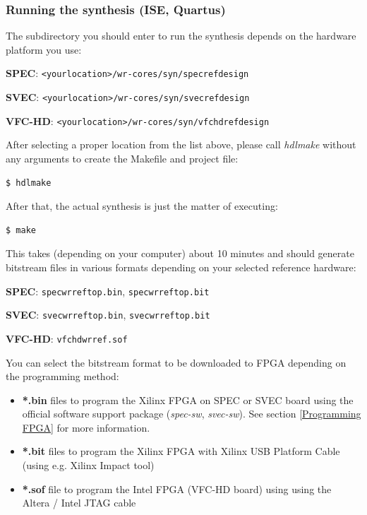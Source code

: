 \documentclass[a4paper, 12pt]{article}
\renewcommand{\_}{\underscore\allowbreak}
\begin{document}
\subsubsection{Running the synthesis (ISE, Quartus)}
The subdirectory you should enter to run the synthesis depends on the hardware
platform you use:
\begin{itemize*}
  \item \textbf{SPEC}: \texttt{<your\_location>/wr-cores/syn/spec\_ref\_design}
  \item \textbf{SVEC}: \texttt{<your\_location>/wr-cores/syn/svec\_ref\_design}
  \item \textbf{VFC-HD}: \texttt{<your\_location>/wr-cores/syn/vfchd\_ref\_design}
\end{itemize*}

After selecting a proper location from the list above, please call
\textit{hdlmake} without any arguments to create the Makefile and project file:
\begin{lstlisting}
$ hdlmake
\end{lstlisting}

After that, the actual synthesis is just the matter of executing:
\begin{lstlisting}
$ make
\end{lstlisting}

This takes (depending on your computer) about 10 minutes and should generate
bitstream files in various formats depending on your selected reference
hardware:
\begin{itemize*}
  \item \textbf{SPEC}: \texttt{spec\_wr\_ref\_top.bin}, \texttt{spec\_wr\_ref\_top.bit}
  \item \textbf{SVEC}: \texttt{svec\_wr\_ref\_top.bin}, \texttt{svec\_wr\_ref\_top.bit}
  \item \textbf{VFC-HD}: \texttt{vfchd\_wr\_ref.sof}
\end{itemize*}

You can select the bitstream format to be downloaded to FPGA depending on the
programming method:
\begin{itemize}
  \item \textbf{*.bin} files to program the Xilinx FPGA on SPEC or SVEC board
    using the official software support package (\textit{spec-sw},
    \textit{svec-sw}). See section \ref{Programming FPGA} for more
    information.
  \item \textbf{*.bit} files to program the Xilinx FPGA with Xilinx USB Platform
    Cable (using e.g. Xilinx Impact tool)
  \item \textbf{*.sof} file to program the Intel FPGA (VFC-HD board) using using
    the Altera / Intel JTAG cable
\end{itemize}
\end{document}

